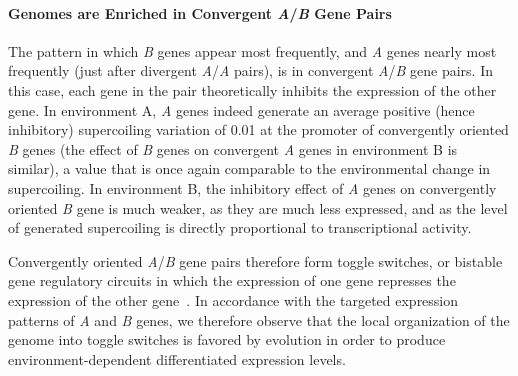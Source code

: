 \paragraph{Genomes are Enriched in Convergent \emph{A}/\emph{B} Gene Pairs}
The pattern in which \emph{B} genes appear most frequently, and \emph{A} genes nearly most frequently (just after divergent \emph{A}/\emph{A} pairs), is in convergent \emph{A}/\emph{B} gene pairs.
In this case, each gene in the pair theoretically inhibits the expression of the other gene.
In environment A, \emph{A}  genes indeed generate an average positive (hence inhibitory) supercoiling variation of 0.01 at the promoter of convergently oriented \emph{B} genes (the effect of \emph{B} genes on convergent \emph{A} genes in environment B is similar), a value that is once again comparable to the environmental change in supercoiling.
In environment B, the inhibitory effect of \emph{A} genes on convergently oriented \emph{B} gene is much weaker, as they are much less expressed, and as the level of generated supercoiling is directly proportional to transcriptional activity.

Convergently oriented \emph{A}/\emph{B} gene pairs therefore form toggle switches, or bistable gene regulatory circuits in which the expression of one gene represses the expression of the other gene~\citep{gardner2000}.
In accordance with the targeted expression patterns of \emph{A} and \emph{B} genes, we therefore observe that the local organization of the genome into toggle switches is favored by evolution in order to produce environment-dependent differentiated expression levels.



